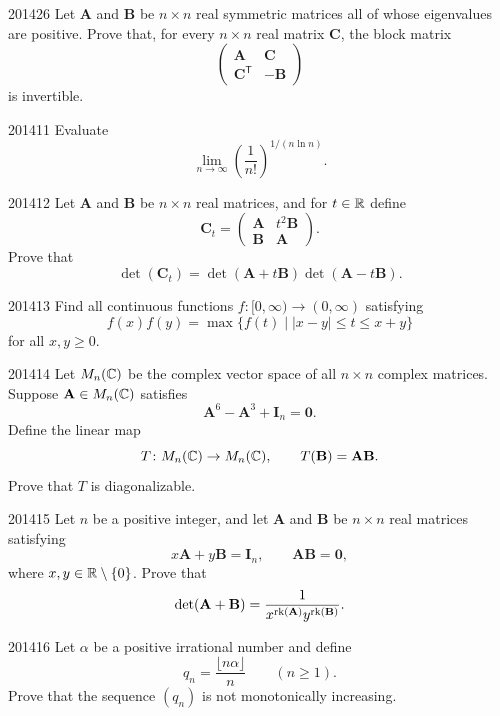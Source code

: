 \begin{problem}{2014}{2}{6}
Let $\mathbf A$ and $\mathbf B$ be $n\times n$ real symmetric matrices all of whose eigenvalues are positive. Prove that, for every $n\times n$ real matrix $\mathbf C$, the block matrix
\[
    \begin{pmatrix}
        \mathbf A&\mathbf C\\
        \mathbf C^{\mathsf T}&-\mathbf B
    \end{pmatrix}
\]
is invertible.
\end{problem}

\begin{problem}{2014}{1}{1}
Evaluate
\[
    \lim_{n\to\infty}
    \left(\frac1{n!}\right)^{1/(n\ln n)}.
\]
\end{problem}

\begin{problem}{2014}{1}{2}
Let $\mathbf A$ and $\mathbf B$ be $n\times n$ real matrices, and for $t\in\mathbb{R}$ define
\[
    \mathbf C_t=
    \begin{pmatrix}
        \mathbf A&t^2\mathbf B\\
        \mathbf B&\mathbf A
    \end{pmatrix}.
\]
Prove that
\[
    \det(\mathbf C_t)
    =
    \det(\mathbf A+t\mathbf B)\det(\mathbf A-t\mathbf B).
\]
\end{problem}

\begin{problem}{2014}{1}{3}
Find all continuous functions $f\colon[0, \infty)\to(0, \infty)$ satisfying
\[
    f(x)f(y)
    =
    \max\{f(t)\mid |x-y|\le t\le x+y\}
\]
for all $x, y\ge0$.
\end{problem}

\begin{problem}{2014}{1}{4}
Let $M_n(\mathbb{C})$ be the complex vector space of all $n\times n$ complex matrices. Suppose $\mathbf A\in M_n(\mathbb{C})$ satisfies
\[
    \mathbf A^6-\mathbf A^3+\mathbf I_n=\mathbf0.
\]
Define the linear map
\[
    T\colon M_n(\mathbb{C})\to M_n(\mathbb{C}),
    \qquad
    T(\mathbf B)=\mathbf A\mathbf B.
\]
Prove that $T$ is diagonalizable.
\end{problem}

\begin{problem}{2014}{1}{5}
Let $n$ be a positive integer, and let $\mathbf A$ and $\mathbf B$ be $n\times n$ real matrices satisfying
\[
    x\mathbf A+y\mathbf B=\mathbf I_n,
    \qquad
    \mathbf A\mathbf B=\mathbf0,
\]
where $x, y\in\mathbb{R}\setminus\{0\}$. Prove that
\[
    \det(\mathbf A+\mathbf B)
    =
    \frac{1}{x^{\operatorname{rk}(\mathbf A)}y^{\operatorname{rk}(\mathbf B)}}.
\]
\end{problem}

\begin{problem}{2014}{1}{6}
Let $\alpha$ be a positive irrational number and define
\[
    q_n=\frac{\lfloor n\alpha\rfloor}{n}
    \qquad(n\ge1).
\]
Prove that the sequence $(q_n)$ is not monotonically increasing.
\end{problem}
